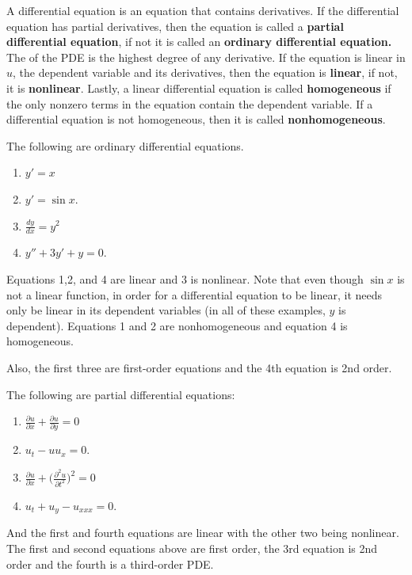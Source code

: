 \begin{definition}
A differential equation is an equation that contains derivatives.  If the differential equation has partial derivatives, then the equation is called a  \textbf{partial differential equation}, if not it is called an \textbf{ordinary differential equation.}  The  of the PDE is the highest degree of any derivative.  If the equation is linear in $u$, the dependent variable and its derivatives, then the equation is \textbf{linear}, if not, it is \textbf{nonlinear}.   Lastly, a linear differential equation is called \textbf{homogeneous} if the only nonzero terms in the equation contain the dependent variable.  If a differential equation is not homogeneous, then it is called \textbf{nonhomogeneous}.  
\end{definition}

\begin{example}
The following are ordinary differential equations. 

\begin{enumerate}
\item $\displaystyle y' = x$ 
\item $\displaystyle y' = \sin x$. 
\item $\displaystyle \frac{dy}{dx}  = y^2$ 
\item $\displaystyle y'' + 3y' + y = 0 $. 
\end{enumerate}

Equations 1,2, and 4 are linear and 3 is nonlinear.  Note that even though $\sin x$ is not a linear function, in order for a differential equation to be linear, it needs only be linear in its dependent variables (in all of these examples, $y$ is dependent).   Equations 1 and 2 are nonhomogeneous and equation 4 is homogeneous. 

Also, the first three are first-order equations and the 4th equation is 2nd order.  


The following are partial differential equations:
\begin{enumerate}
\item $\displaystyle \frac{\partial u}{\partial x} + \frac{\partial u}{\partial y} = 0$ 
\item $\displaystyle u_{t} -u  u_x = 0$.  
\item $\displaystyle \frac{\partial u}{\partial x} + \biggl(\frac{\partial^2 u}{\partial {t}^2}    \biggr)^2  = 0 $
\item $\displaystyle u_{t} +u_y - u_{xxx} = 0$.  
\end{enumerate}

And the first and fourth equations are linear with the other two being nonlinear.  The first and second equations above are first order, the 3rd equation is 2nd order and the fourth is a third-order PDE.  


\end{example}

